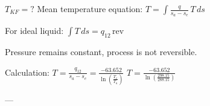 \( T_{KF} = ? \)  
Mean temperature equation:  
\( T = \int \frac{q}{s_a - s_e} \, T \, ds \)  

For ideal liquid:  
\( \int T \, ds = q_{12} \, \text{rev} \)  

Pressure remains constant, process is not reversible.  

Calculation:  
\( T = \frac{q_{12}}{s_a - s_e} = \frac{-63.652}{\ln \left( \frac{T_e}{T_a} \right)} \)  
\( T = \frac{-63.652}{\ln \left( \frac{298.15}{288.15} \right)} \)  

---